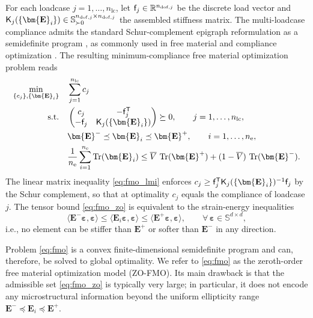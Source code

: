 \documentclass[preprint,3p]{elsarticle}
\newcommand{\tenss}[1]{\bm{\mathbf{#1}}}            %
\newcommand{\tensf}[1]{\bm{\mathbf{#1}}}            %
\newcommand{\trn}{\mathsf{T}}                       %
\newcommand{\strain}{\tenss{\varepsilon}}           %
\newcommand{\Ei}{\tensf{E}_i}                       %
\newcommand{\Emin}{\tensf{E}^{-}}                   %
\newcommand{\Emax}{\tensf{E}^{+}}                   %
\newcommand{\nel}{n_\mathrm{e}}                     %
\newcommand{\nlc}{n_\mathrm{lc}}                    %
\newcommand{\semtrx}[1]{\ifcat\noexpand#1\relax\bm{#1}\else\mathsf{#1}\fi}
\newcommand{\sevek}[1]{\ifcat\noexpand#1\relax\bm{#1}\else\mathsf{#1}\fi}
\newcommand{\Tr}{\operatorname{Tr}}
\begin{document}
For each loadcase $j=1,\dots,\nlc$, let $\sevek f_j\in\mathbb R^{n_{\mathrm{dof},j}}$ be the discrete load vector and $\semtrx K_j(\{\Ei\})\in\mathbb{S}^{n_{\mathrm{dof},j}\times n_{\mathrm{dof},j}}_{\succ 0}$ the assembled stiffness matrix. The multi-loadcase compliance admits the standard Schur-complement epigraph reformulation as a semidefinite program \citep[Appendix~A]{Boyd2004}, as commonly used in free material and compliance optimization \citep{BenTal2000,Kocvara2020}. The resulting minimum-compliance free material optimization problem reads
%
\begin{subequations}\label{eq:fmo}
\begin{align}
    \min_{\{c_j\}, \{\Ei\}} \quad & \sum_{j=1}^{\nlc} c_j
    \label{eq:fmo_compliance}\\
    \mathrm{s.t.}\quad &
    \begin{pmatrix}
        c_j & -\sevek{f}_j^\trn\\
        -\sevek{f}_j & \semtrx{K}_j\!\left(\{\Ei\}\right)
    \end{pmatrix}\succeq 0, \qquad j = 1,\dots,\nlc,
    \label{eq:fmo_lmi}\\
    & \Emin \preceq \Ei \preceq \Emax, \qquad i = 1,\dots,\nel,
    \label{eq:fmo_zo}\\
    & \frac{1}{\nel}\sum_{i=1}^{\nel} \Tr(\Ei)
      \le \overline{V}\,\Tr(\Emax) + (1-\overline{V})\,\Tr(\Emin).
    \label{eq:fmo_volume}
\end{align}
\end{subequations}
%
The linear matrix inequality \eqref{eq:fmo_lmi} enforces $c_j \ge \sevek{f}_j^\trn \semtrx{K}_j(\{\Ei\})^{-1} \sevek{f}_j$ by the Schur complement, so that at optimality $c_j$ equals the compliance of loadcase $j$. The tensor bound \eqref{eq:fmo_zo} is equivalent to the strain-energy inequalities
%
\begin{equation}
\langle \Emin \strain,\strain\rangle \le \langle \Ei \strain,\strain\rangle \le \langle \Emax \strain,\strain\rangle,
\qquad \forall\,\strain\in\mathbb{S}^{d\times d},
\end{equation}
%
i.e., no element can be stiffer than $\Emax$ or softer than $\Emin$ in any direction.

Problem \eqref{eq:fmo} is a convex finite-dimensional semidefinite program and can, therefore, be solved to global optimality. We refer to \eqref{eq:fmo} as the zeroth-order free material optimization model (ZO-FMO). Its main drawback is that the admissible set \eqref{eq:fmo_zo} is typically very large; in particular, it does not encode any microstructural information beyond the uniform ellipticity range $\Emin\preceq\Ei\preceq\Emax$.
\end{document}
